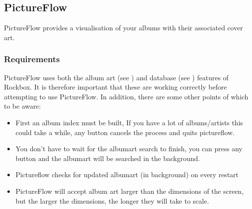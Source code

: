 \subsection{PictureFlow}
PictureFlow provides a visualisation of your albums with their associated cover
art. 


\subsubsection{Requirements}
PictureFlow uses both the album art (see ) and 
database (see ) features of Rockbox.
It is therefore important that these are working correctly before attempting
to use PictureFlow. In addition, there are some other points of which to be
aware:

  \begin{itemize}
    \item First an album index must be built, If you have a lot of albums/artists
    this could take a while, any button cancels the process and quits pictureflow.
    \item You don't have to wait for the albumart search to finish, you can press
    any button and the albumart will be searched in the background.
    \item Pictureflow checks for updated albumart (in background) on every restart
    \item PictureFlow will accept album art larger than the dimensions of the
    screen, but the larger the dimensions, the longer they will take to scale.
  \end{itemize}

